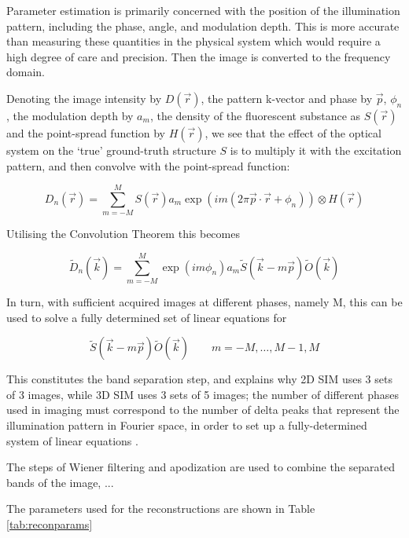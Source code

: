 \documentclass[12pt]{article}
\begin{document}
Parameter estimation is primarily concerned with the position of the illumination pattern,
including the phase, angle, and modulation depth.
This is more accurate than measuring these quantities in the physical system which would require a high degree of care and precision.
Then the image is converted to the frequency domain.

Denoting the image intensity by $D(\vec{r})$, the pattern k-vector and phase by $\vec{p}$, $\phi_n$,
the modulation depth by $a_m$, the density of the fluorescent substance as $S(\vec{r})$ and the point-spread function by $H(\vec{r})$,
we see that the effect of the optical system on the `true' ground-truth structure $S$ is to multiply it with the excitation pattern,
and then convolve with the point-spread function:

\[D_n(\vec{r}) = \sum_{m=-M}^{M}{S(\vec{r})a_m\exp(im(2\pi\vec{p}\cdot\vec{r}+\phi_n))\otimes H(\vec{r})}\]

Utilising the Convolution Theorem this becomes

\[\tilde{D}_n(\vec{k}) = \sum_{m=-M}^{M}{\exp(im\phi_n)a_m\tilde{S}(\vec{k}-m\vec{p})\tilde{O}(\vec{k})}\]

In turn, with sufficient acquired images at different phases, namely M, this can be used to solve a fully determined set of linear equations for

\[\tilde{S}(\vec{k}-m\vec{p})\tilde{O}(\vec{k})\qquad m=-M,\dots,M-1,M\]

This constitutes the band separation step, and explains why 2D SIM uses 3 sets of 3 images, while 3D SIM uses 3 sets of 5 images;
the number of different phases used in imaging must correspond to the number of delta peaks that represent the illumination pattern in Fourier space,
in order to set up a fully-determined system of linear equations \cite{params}.

The steps of Wiener filtering and apodization are used to combine the separated bands of the image, ...

The parameters used for the reconstructions are shown in Table \ref{tab:reconparams}
\end{document}
